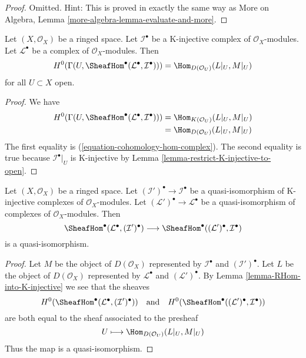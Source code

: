 \begin{proof}
Omitted. Hint: This is proved in exactly the same way as
More on Algebra, Lemma \ref{more-algebra-lemma-evaluate-and-more}.
\end{proof}

\begin{lemma}
\label{lemma-RHom-into-K-injective}
Let $(X, \mathcal{O}_X)$ be a ringed space. Let $\mathcal{I}^\bullet$
be a K-injective complex of $\mathcal{O}_X$-modules. Let
$\mathcal{L}^\bullet$ be a complex of $\mathcal{O}_X$-modules.
Then
$$
H^0(\Gamma(U, \SheafHom^\bullet(\mathcal{L}^\bullet, \mathcal{I}^\bullet))) =
\Hom_{D(\mathcal{O}_U)}(L|_U, M|_U)
$$
for all $U \subset X$ open.
\end{lemma}

\begin{proof}
We have
\begin{align*}
H^0(\Gamma(U, \SheafHom^\bullet(\mathcal{L}^\bullet, \mathcal{I}^\bullet)))
& =
\Hom_{K(\mathcal{O}_U)}(L|_U, M|_U) \\
& =
\Hom_{D(\mathcal{O}_U)}(L|_U, M|_U)
\end{align*}
The first equality is (\ref{equation-cohomology-hom-complex}).
The second equality is true because $\mathcal{I}^\bullet|_U$
is K-injective by Lemma \ref{lemma-restrict-K-injective-to-open}.
\end{proof}

\begin{lemma}
\label{lemma-RHom-well-defined}
Let $(X, \mathcal{O}_X)$ be a ringed space. Let
$(\mathcal{I}')^\bullet \to \mathcal{I}^\bullet$
be a quasi-isomorphism of K-injective complexes of $\mathcal{O}_X$-modules.
Let $(\mathcal{L}')^\bullet \to \mathcal{L}^\bullet$
be a quasi-isomorphism of complexes of $\mathcal{O}_X$-modules.
Then
$$
\SheafHom^\bullet(\mathcal{L}^\bullet, (\mathcal{I}')^\bullet)
\longrightarrow
\SheafHom^\bullet((\mathcal{L}')^\bullet, \mathcal{I}^\bullet)
$$
is a quasi-isomorphism.
\end{lemma}

\begin{proof}
Let $M$ be the object of $D(\mathcal{O}_X)$ represented by
$\mathcal{I}^\bullet$ and $(\mathcal{I}')^\bullet$.
Let $L$ be the object of $D(\mathcal{O}_X)$ represented by
$\mathcal{L}^\bullet$ and $(\mathcal{L}')^\bullet$.
By Lemma \ref{lemma-RHom-into-K-injective}
we see that the sheaves
$$
H^0(\SheafHom^\bullet(\mathcal{L}^\bullet, (\mathcal{I}')^\bullet))
\quad\text{and}\quad
H^0(\SheafHom^\bullet((\mathcal{L}')^\bullet, \mathcal{I}^\bullet))
$$
are both equal to the sheaf associated to the presheaf
$$
U \longmapsto \Hom_{D(\mathcal{O}_U)}(L|_U, M|_U)
$$
Thus the map is a quasi-isomorphism.
\end{proof}

